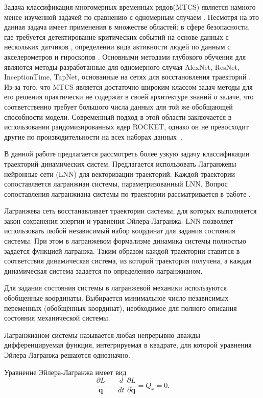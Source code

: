 \documentclass[a4paper, 12pt]{article}
\begin{document}
Задача классификация многомерных временных рядов(MTCS) является намного менее изученной задачей по сравнению с одномерным случаем \cite{MTCSreview}. Несмотря на это данная задача имеет применения в множестве областей: в сфере безопасности, где требуется детектирование критических событий на основе данных с нескольких датчиков \cite{MTCSindustrial}, определении вида активности людей по данным с акселерометров и гироскопов \cite{MTCSactivity}. Основными методами глубокого обучения для являются методы разработанные для одномерного случая AlexNet, ResNet, InceptionTime, TapNet, основанные на сетях для восстановления траекторий \cite{MTCSreview}. Из-за того, что MTCS является достаточно широким классом задач методы для его решения практически не содержат в своей архитектуре знаний о задаче, что соответственно требует большого числа данных для той же обобщающей способности модели. Современный подход в этой области заключается в использовании рандомизированных ядер ROCKET, однако он не превосходит другие по производительности на всех наборах данных~\cite{TCSreview}\cite{ROCKET}.

В данной работе предлагается рассмотреть более узкую задачу классификации траекторий динамических систем. Предлагается использовать Лагранжевы нейронные сети (LNN) для векторизации траекторий. Каждой траектории сопоставляется лагранжиан системы, параметризованный LNN. Вопрос сопоставления лагранжиана системы по траектории рассматривается  в работе \cite{article}. 

Лагранжева сеть восстанавливает траектории системы, для которых выполняется закон сохранения энергии и уравнения Эйлера-Лагранжа. LNN позволяет использовать любой независимый набор координат для задания состояния системы. При этом в лагранжевом формализме динамика системы полностью задается функцией лагранжа. Таким образом каждой траектории ставится в соответствия динамическая система, из которой траектория получена, а каждая динамическая система задается по определению лагранжианом. 

Для задания состояния системы в лагранжевой механики используются обобщенные координаты.  Выбирается минимальное число независимых переменных (обобщённых координат), необходимое для полного описания состояния механической системы. 

Лагранжианом системы называется любая непрерывно дважды дифференцируемая функция, интегрируемая в квадрате, для которой уравнения Эйлера-Лагранжа решаются однозначно.

Уравнение Эйлера-Лагранжа имеет вид
\begin{equation}
    \frac{\partial L}{\mathbf{q}}\ -\ \frac{d}{dt}\ \frac{\partial L}{\partial\dot{\mathbf{q}}}=Q_x=0.
\end{equation}
\end{document}
